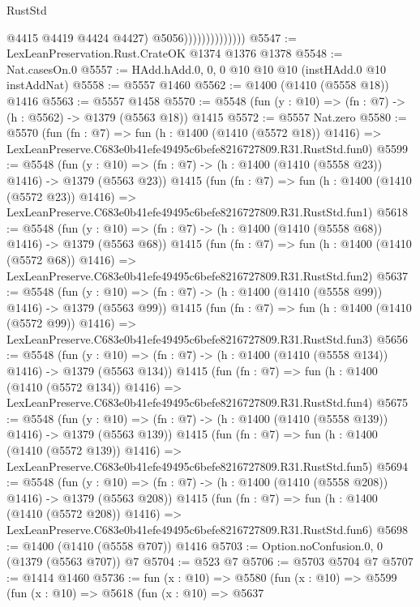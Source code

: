\begin{lexlean}{RustStd}
\begin{coremodule}
                                  @4415
                                  @4419
                                  @4424
                                  @4427)
                                @5056))))))))))))))
@5547 := LexLeanPreservation.Rust.CrateOK @1374 @1376 @1378
@5548 := Nat.casesOn.{0}
@5557 := HAdd.hAdd.{0, 0, 0} @10 @10 @10 (instHAdd.{0} @10 instAddNat)
@5558 := @5557 @1460
@5562 := @1400 (@1410 (@5558 @18)) @1416
@5563 := @5557 @1458
@5570 := @5548 (fun (y : @10) => (fn : @7) -> (h : @5562) -> @1379 (@5563 @18)) @1415
@5572 := @5557 Nat.zero
@5580 := @5570
    (fun (fn : @7) =>
    fun (h : @1400 (@1410 (@5572 @18)) @1416) =>
    LexLeanPreserve.C683e0b41efe49495c6befe8216727809.R31.RustStd.fun0)
@5599 := @5548
    (fun (y : @10) => (fn : @7) -> (h : @1400 (@1410 (@5558 @23)) @1416) -> @1379 (@5563 @23))
    @1415
    (fun (fn : @7) =>
    fun (h : @1400 (@1410 (@5572 @23)) @1416) =>
    LexLeanPreserve.C683e0b41efe49495c6befe8216727809.R31.RustStd.fun1)
@5618 := @5548
    (fun (y : @10) => (fn : @7) -> (h : @1400 (@1410 (@5558 @68)) @1416) -> @1379 (@5563 @68))
    @1415
    (fun (fn : @7) =>
    fun (h : @1400 (@1410 (@5572 @68)) @1416) =>
    LexLeanPreserve.C683e0b41efe49495c6befe8216727809.R31.RustStd.fun2)
@5637 := @5548
    (fun (y : @10) => (fn : @7) -> (h : @1400 (@1410 (@5558 @99)) @1416) -> @1379 (@5563 @99))
    @1415
    (fun (fn : @7) =>
    fun (h : @1400 (@1410 (@5572 @99)) @1416) =>
    LexLeanPreserve.C683e0b41efe49495c6befe8216727809.R31.RustStd.fun3)
@5656 := @5548
    (fun (y : @10) => (fn : @7) -> (h : @1400 (@1410 (@5558 @134)) @1416) -> @1379 (@5563 @134))
    @1415
    (fun (fn : @7) =>
    fun (h : @1400 (@1410 (@5572 @134)) @1416) =>
    LexLeanPreserve.C683e0b41efe49495c6befe8216727809.R31.RustStd.fun4)
@5675 := @5548
    (fun (y : @10) => (fn : @7) -> (h : @1400 (@1410 (@5558 @139)) @1416) -> @1379 (@5563 @139))
    @1415
    (fun (fn : @7) =>
    fun (h : @1400 (@1410 (@5572 @139)) @1416) =>
    LexLeanPreserve.C683e0b41efe49495c6befe8216727809.R31.RustStd.fun5)
@5694 := @5548
    (fun (y : @10) => (fn : @7) -> (h : @1400 (@1410 (@5558 @208)) @1416) -> @1379 (@5563 @208))
    @1415
    (fun (fn : @7) =>
    fun (h : @1400 (@1410 (@5572 @208)) @1416) =>
    LexLeanPreserve.C683e0b41efe49495c6befe8216727809.R31.RustStd.fun6)
@5698 := @1400 (@1410 (@5558 @707)) @1416
@5703 := Option.noConfusion.{0, 0} (@1379 (@5563 @707)) @7
@5704 := @523 @7
@5706 := @5703 @5704 @7
@5707 := @1414 @1460
@5736 := fun (x : @10) =>
  @5580
    (fun (x : @10) =>
    @5599
      (fun (x : @10) =>
      @5618
        (fun (x : @10) =>
        @5637

\end{coremodule}
\end{lexlean}

